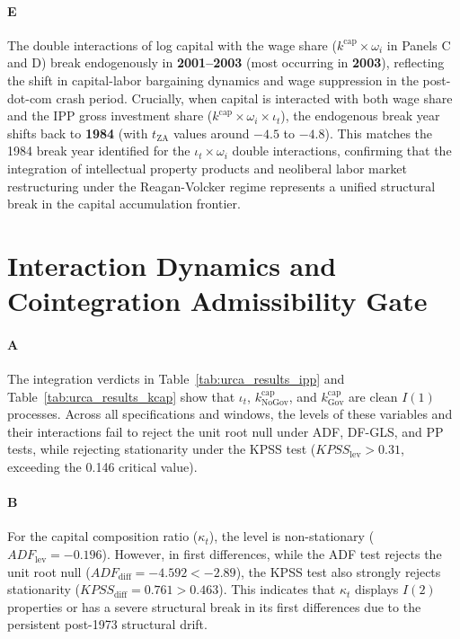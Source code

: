 \documentclass[11pt,a4paper]{article}
\begin{document}
\paragraph{E}
The double interactions of log capital with the wage share ($k^{\text{cap}} \times \omega_i$ in Panels C and D) break endogenously in \textbf{2001--2003} (most occurring in \textbf{2003}), reflecting the shift in capital-labor bargaining dynamics and wage suppression in the post-dot-com crash period. Crucially, when capital is interacted with both wage share and the IPP gross investment share ($k^{\text{cap}} \times \omega_i \times \iota_t$), the endogenous break year shifts back to \textbf{1984} (with $t_{\text{ZA}}$ values around $-4.5$ to $-4.8$). This matches the 1984 break year identified for the $\iota_t \times \omega_i$ double interactions, confirming that the integration of intellectual property products and neoliberal labor market restructuring under the Reagan-Volcker regime represents a unified structural break in the capital accumulation frontier.

\FloatBarrier
\section{Interaction Dynamics and Cointegration Admissibility Gate}

\paragraph{A}
The integration verdicts in Table~\ref{tab:urca_results_ipp} and Table~\ref{tab:urca_results_kcap} show that $\iota_t$, $k^{\text{cap}}_{\text{NoGov}}$, and $k^{\text{cap}}_{\text{Gov}}$ are clean $I(1)$ processes. Across all specifications and windows, the levels of these variables and their interactions fail to reject the unit root null under ADF, DF-GLS, and PP tests, while rejecting stationarity under the KPSS test ($KPSS_{\text{lev}} > 0.31$, exceeding the 0.146 critical value).

\paragraph{B}
For the capital composition ratio ($\kappa_t$), the level is non-stationary ($ADF_{\text{lev}} = -0.196$). However, in first differences, while the ADF test rejects the unit root null ($ADF_{\text{diff}} = -4.592 < -2.89$), the KPSS test also strongly rejects stationarity ($KPSS_{\text{diff}} = 0.761 > 0.463$). This indicates that $\kappa_t$ displays $I(2)$ properties or has a severe structural break in its first differences due to the persistent post-1973 structural drift.
\end{document}
